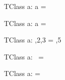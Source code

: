 \documentclass{article}
\begin{document}
\begin{zed}
  [DNI]
\end{zed}



\begin{schema}{TClass}
	a: \seq \nat
\where
	a = \langle \rangle	

\end{schema}


\begin{schema}{TClass}
	a: \seq \nat
\where
	a = \emptyset[\nat \cross \nat]

\end{schema}


\begin{schema}{TClass}
	a: \seq \nat
\where
	,2,3 \rangle = ,5 \rangle

\end{schema}


\begin{schema}{TClass}
	a: \seq \nat
\where
	 \rangle~=~ \rangle

\end{schema}

\begin{schema}{TClass}
	a: \seq \nat
\where
	 \rangle =  \rangle

\end{schema}
\end{document}
